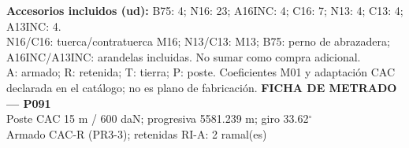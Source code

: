 \begingroup\scriptsize
\textbf{Accesorios incluidos (ud):} B75: 4; N16: 23; A16INC: 4; C16: 7; N13: 4; C13: 4; A13INC: 4.\\
N16/C16: tuerca/contratuerca M16; N13/C13: M13; B75: perno de abrazadera; A16INC/A13INC: arandelas incluidas. No sumar como compra adicional.\\
A: armado; R: retenida; T: tierra; P: poste. Coeficientes M01 y adaptación CAC declarada en el catálogo; no es plano de fabricación.
\endgroup\endgroup
\clearpage{}
\begingroup\small\setlength{\parskip}{3pt}\renewcommand{\arraystretch}{1.05}
\textbf{\large FICHA DE METRADO — P091}\\[4pt]
Poste CAC 15 m / 600 daN; progresiva 5581.239 m; giro 33.62\ensuremath{^\circ}\\
Armado CAC-R (PR3-3); retenidas RI-A: 2 ramal(es)\\
\begingroup\scriptsize
